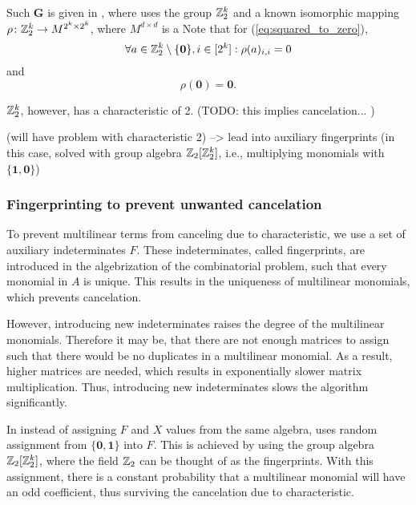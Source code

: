 Such $\mathbf{G}$ is given in \cite{Koutis08}, where \citeauthor{Koutis08} uses the group $\mathbb Z_2^k$ 
and a known \cite{Terras99} 
isomorphic mapping $\rho \colon \mathbb Z_2^k \to M^{2^k \times 2^k}$, where $M^{d \times d}$ is a 
 Note that for (\ref{eq:squared_to_zero}), 
\[
\forall a \in \mathbb Z_2^k \setminus \{\mathbf{0}\}, i \in [2^k]: \rho(a)_{i,i} = 0\]and \[
\rho(\mathbf{0}) = \mathbf{0}.
\]

$\mathbb Z_2^k$, however, has a characteristic of 2. (TODO: this implies cancelation... )


(will have problem with characteristic 2) 
--> lead into auxiliary fingerprints (in this case, solved with group algebra $\mathbb Z_2[\mathbb Z_2^k]$, i.e., 
multiplying monomials with $\{\mathbf{1}, \mathbf{0}\}$)



\subsubsection{Fingerprinting to prevent unwanted cancelation}

To prevent multilinear terms from canceling  due to
characteristic, we use a set of auxiliary indeterminates $F$. 
These indeterminates, called fingerprints, are introduced in the algebrization 
of the combinatorial problem, such that every monomial in $A$ is unique. 
This results in the uniqueness of multilinear monomials, which prevents
cancelation.

However, introducing new indeterminates raises the degree of the multilinear monomials. 
Therefore it may be, that there are not enough matrices to assign such that there would be no 
duplicates in a multilinear monomial. As a result, higher
 matrices are needed, which 
results in exponentially slower matrix multiplication. %
Thus, introducing new indeterminates slows the algorithm significantly. 

In \cite{Koutis08} instead of assigning $F$ and $X$ values from the same algebra, 
\citeauthor{Koutis08} uses random assignment from $\{\mathbf{0}, \mathbf{1}\}$ into $F$. 
This is achieved by using the group algebra $\mathbb Z_2[\mathbb Z_2^k]$, where the field $\mathbb Z_2$ can be 
thought of as the fingerprints. 
With this assignment, there is a constant probability that a multilinear monomial will have an odd coefficient, 
thus surviving the cancelation due to characteristic.

